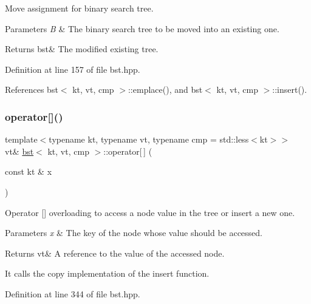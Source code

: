 Move assignment for binary search tree. 


\begin{DoxyParams}{Parameters}
{\em B} & The binary search tree to be moved into an existing one. \\
\hline
\end{DoxyParams}
\begin{DoxyReturn}{Returns}
bst\& The modified existing tree. 
\end{DoxyReturn}


Definition at line 157 of file bst.\+hpp.



References bst$<$ kt, vt, cmp $>$\+::emplace(), and bst$<$ kt, vt, cmp $>$\+::insert().

\mbox{\label{classbst_ab1a1eec5b236a7fbd9c6da8d65786b10}} 
\subsubsection{\texorpdfstring{operator[]()}{operator[]()}\hspace{0.1cm}{\footnotesize\ttfamily [1/2]}}
{\footnotesize\ttfamily template$<$typename kt, typename vt, typename cmp = std\+::less$<$kt$>$$>$ \\
vt\& \hyperlink{classbst}{bst}$<$ kt, vt, cmp $>$\+::operator\mbox{[}$\,$\mbox{]} (\begin{DoxyParamCaption}\item[{const kt \&}]{x }\end{DoxyParamCaption})\hspace{0.3cm}{\ttfamily [inline]}}



Operator \mbox{[}\mbox{]} overloading to access a node value in the tree or insert a new one. 


\begin{DoxyParams}{Parameters}
{\em x} & The key of the node whose value should be accessed. \\
\hline
\end{DoxyParams}
\begin{DoxyReturn}{Returns}
vt\& A reference to the value of the accessed node.
\end{DoxyReturn}
It calls the copy implementation of the insert function. 

Definition at line 344 of file bst.\+hpp.



